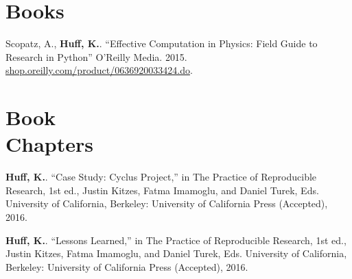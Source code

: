 \documentclass[margin,line]{resume}
\begin{document}
\begin{resume}
               \vspace{-2mm}
    \section{\mysidestyle Books}
      \begin{bibenum}
      \item Scopatz, A., \textbf{Huff, K.}. ``Effective Computation in
      Physics: Field Guide to Research in Python'' O'Reilly Media. 2015.
      \url{shop.oreilly.com/product/0636920033424.do}.
      \end{bibenum}
    \section{\mysidestyle Book\\Chapters}
      \begin{bibenum} 
      \item \textbf{Huff, K.}. ``Case Study: Cyclus Project,'' in The Practice 
              of Reproducible Research, 1st ed., Justin Kitzes, Fatma Imamoglu, 
              and Daniel Turek, Eds. University of California, Berkeley: 
              University of California Press (Accepted), 2016.
      \item \textbf{Huff, K.}. ``Lessons Learned,'' in The Practice of Reproducible 
              Research, 1st ed., Justin Kitzes, Fatma Imamoglu, and Daniel 
              Turek, Eds. University of California, Berkeley: University of 
              California Press (Accepted), 2016.
      \end{bibenum}


\end{resume}
\end{document}
